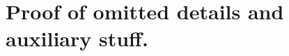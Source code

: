 \documentclass{article}      %
\DeclareMathOperator{\T}{T}
\begin{document}
%
%
%
%
%
%
%
%
%
%
%
%
%






\section{ Proof of omitted details and auxiliary stuff. }
\end{document}
